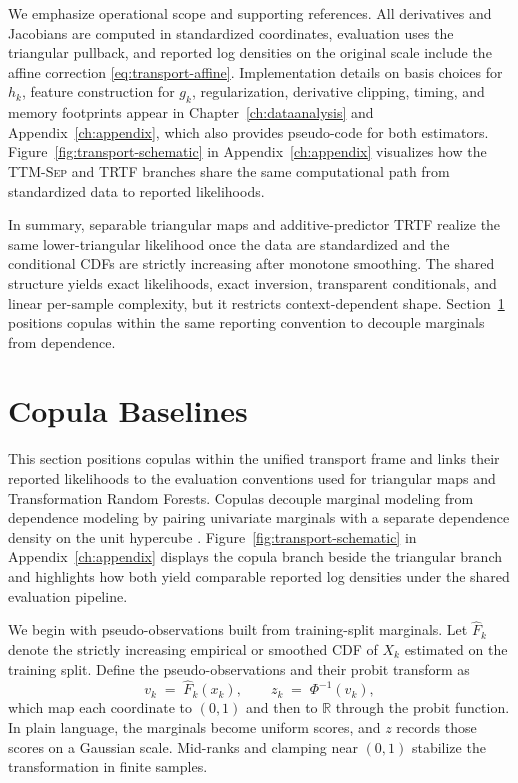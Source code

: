 \documentclass[11pt,a4paper,twoside]{book}\usepackage[]{graphicx}\usepackage[]{xcolor}
\begin{document}
We emphasize operational scope and supporting references. All derivatives and Jacobians are computed in standardized coordinates, evaluation uses the triangular pullback, and reported log densities on the original scale include the affine correction \eqref{eq:transport-affine}. Implementation details on basis choices for $h_k$, feature construction for $g_k$, regularization, derivative clipping, timing, and memory footprints appear in Chapter~\ref{ch:dataanalysis} and Appendix~\ref{ch:appendix}, which also provides pseudo-code for both estimators. Figure~\ref{fig:transport-schematic} in Appendix~\ref{ch:appendix} visualizes how the \textsc{TTM-Sep} and \textsc{TRTF} branches share the same computational path from standardized data to reported likelihoods.

In summary, separable triangular maps and additive-predictor TRTF realize the same lower-triangular likelihood once the data are standardized and the conditional CDFs are strictly increasing after monotone smoothing. The shared structure yields exact likelihoods, exact inversion, transparent conditionals, and linear per-sample complexity, but it restricts context-dependent shape. Section~\ref{sec:transport-copula} positions copulas within the same reporting convention to decouple marginals from dependence.

\section{Copula Baselines}\label{sec:transport-copula}

This section positions copulas within the unified transport frame and links their reported likelihoods to the evaluation conventions used for triangular maps and Transformation Random Forests. Copulas decouple marginal modeling from dependence modeling by pairing univariate marginals with a separate dependence density on the unit hypercube \citep{nelsen2006introduction,joe2014dependence}. Figure~\ref{fig:transport-schematic} in Appendix~\ref{ch:appendix} displays the copula branch beside the triangular branch and highlights how both yield comparable reported log densities under the shared evaluation pipeline.

We begin with pseudo-observations built from training-split marginals. Let $\widehat F_k$ denote the strictly increasing empirical or smoothed CDF of $X_k$ estimated on the training split. Define the pseudo-observations and their probit transform as
\begin{equation}
  v_k \;=\; \widehat F_k(x_k),\qquad z_k \;=\; \Phi^{-1}(v_k),\label{eq:copula-probit}
\end{equation}
which map each coordinate to $(0,1)$ and then to $\mathbb{R}$ through the probit function. In plain language, the marginals become uniform scores, and $z$ records those scores on a Gaussian scale. Mid-ranks and clamping near $(0,1)$ stabilize the transformation in finite samples.
\end{document}
